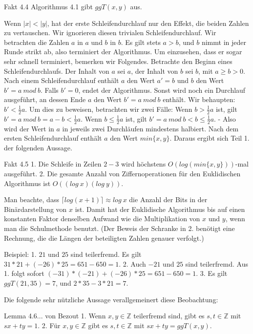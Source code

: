\documentclass[a4paper]{article}
\begin{document}
\begin{multicols}{3}
    Fakt 4.4 Algorithmus 4.1 gibt $ggT(x,y)$ aus.

    Wenn $|x|<|y|$, hat der erste Schleifendurchlauf nur den Effekt, die beiden Zahlen zu vertauschen. Wir ignorieren diesen trivialen Schleifendurchlauf. Wir betrachten die Zahlen $a$ in $a$ und $b$ in $b$. Es gilt stets $a>b$, und $b$ nimmt in jeder Runde strikt ab, also terminiert der Algorithmus. Um einzusehen, dass er sogar sehr schnell terminiert, bemerken wir Folgendes. Betrachte den Beginn eines Schleifendurchlaufs. Der Inhalt von $a$ sei $a$, der Inhalt von $b$ sei $b$, mit $a\geq b >0$. Nach einem Schleifendurchlauf enthält $a$ den Wert $a'=b$ und $b$ den Wert $b'=a\ mod\ b$. Falls $b'=0$, endet der Algorithmus. Sonst wird noch ein Durchlauf ausgeführt, an dessen Ende $a$ den Wert $b'=a\ mod\ b$ enthält. Wir behaupten: $b'<\frac{1}{2} a$. Um dies zu beweisen, betrachten wir zwei Fälle: Wenn $b>\frac{1}{2} a$ ist, gilt $b'=a\ mod\ b=a-b<\frac{1}{2} a$. Wenn $b\leq\frac{1}{2} a$ ist, gilt $b'=a\ mod\ b < b\leq\frac{1}{2} a$. - Also wird der Wert in $a$ in jeweils zwei Durchläufen mindestens halbiert. Nach dem ersten Schleifendurchlauf enthält $a$ den Wert $min\{x,y\}$. Daraus ergibt sich Teil 1. der folgenden Aussage.

    Fakt 4.5
    1. Die Schleife in Zeilen $2-3$ wird höchstens $O(log(min\{x,y\}))$-mal ausgeführt.
    2. Die gesamte Anzahl von Ziffernoperationen für den Euklidischen Algorithmus ist $O((log\ x)(log\ y))$.

    Man beachte, dass $\lceil log(x+1)\rceil\approx log\ x$ die Anzahl der Bits in der Binärdarstellung von $x$ ist. Damit hat der Euklidische Algorithmus bis auf einen konstanten Faktor denselben Aufwand wie die Multiplikation von $x$ und $y$, wenn man die Schulmethode benutzt. (Der Beweis der Schranke in 2. benötigt eine Rechnung, die die Längen der beteiligten Zahlen genauer verfolgt.)

    Beispiel:
    1. $21$ und $25$ sind teilerfremd. Es gilt $31*21 + (-26)*25 = 651-650 = 1$.
    2. Auch $-21$ und $25$ sind teilerfremd. Aus 1. folgt sofort $(-31)*(-21) + (-26)*25 =651 -650 = 1$.
    3. Es gilt $ggT(21,35) = 7$, und $2* 35 - 3 *21 = 7$.

    Die folgende sehr nützliche Aussage verallgemeinert diese Beobachtung:

    Lemma 4.6... von Bezout
    1. Wenn $x,y\in\mathbb{Z}$ teilerfremd sind, gibt es $s,t\in\mathbb{Z}$ mit $sx+ty= 1$.
    2. Für $x,y\in\mathbb{Z}$ gibt es $s,t\in\mathbb{Z}$ mit $sx+ty= ggT(x,y)$.


\end{multicols}
\end{document}
